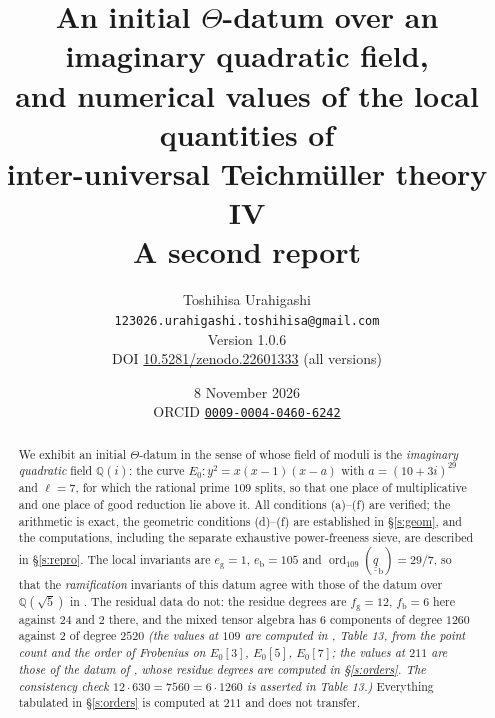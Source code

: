 \documentclass[11pt]{article}
\title{An initial $\Theta$-datum over an imaginary quadratic field,\\
and numerical values of the local quantities of\\
inter-universal Teichm\"uller theory IV\\
\large A second report}
\author{Toshihisa Urahigashi\\
\small\texttt{123026.urahigashi.toshihisa@gmail.com}\\[2pt]
\small Version 1.0.6\\[1pt]
\small DOI \href{https://doi.org/10.5281/zenodo.22601333}{10.5281/zenodo.22601333} (all versions)}
\date{8 November 2026\\[3pt]
\small ORCID \href{https://orcid.org/0009-0004-0460-6242}{\texttt{0009-0004-0460-6242}}}
\theoremstyle{plain}
\theoremstyle{definition}
\newcommand{\ord}{\operatorname{ord}}
\begin{document}
\maketitle

\begin{abstract}
We exhibit an initial $\Theta$-datum in the sense of \cite[Def.~3.1]{IUT1} whose
field of moduli is the \emph{imaginary quadratic} field $\mathbb{Q}(i)$: the curve
$E_0:y^2=x(x-1)(x-a)$ with $a=(10+3i)^{29}$ and $\ell=7$, for which the rational
prime $109$ splits, so that one place of multiplicative and one place of good
reduction lie above it.  All conditions (a)--(f) are verified; the arithmetic is
exact, the geometric conditions (d)--(f) are established in \S\ref{s:geom}, and
the computations, including the separate exhaustive power-freeness sieve, are
described in \S\ref{s:repro}.  The local invariants are $e_{\mathrm g}=1$,
$e_{\mathrm b}=105$ and
$\ord_{109}(\underline{\underline q}_{\mathrm b})=29/7$, so that the
\emph{ramification} invariants of this datum agree with those of the datum over
$\mathbb{Q}(\sqrt5)$ in \cite{First}.  The residual data do not: the residue degrees
are $f_{\mathrm g}=12$, $f_{\mathrm b}=6$ here against $24$ and $2$ there, and the mixed
tensor algebra has $6$ components of degree $1260$ against $2$ of degree $2520$
\emph{(the values at $109$ are computed in , Table 13, from
the point count and the order of Frobenius on $E_0[3]$, $E_0[5]$, $E_0[7]$; the values
at $211$ are those of the datum of \cite{First}, whose residue degrees are computed in
\S\ref{s:orders}.  The consistency check
$12\cdot630=7560=6\cdot1260$ is asserted in Table 13.)}  Everything tabulated in
\S\ref{s:orders} is computed at $211$ and does not transfer.


\end{abstract}
\end{document}
